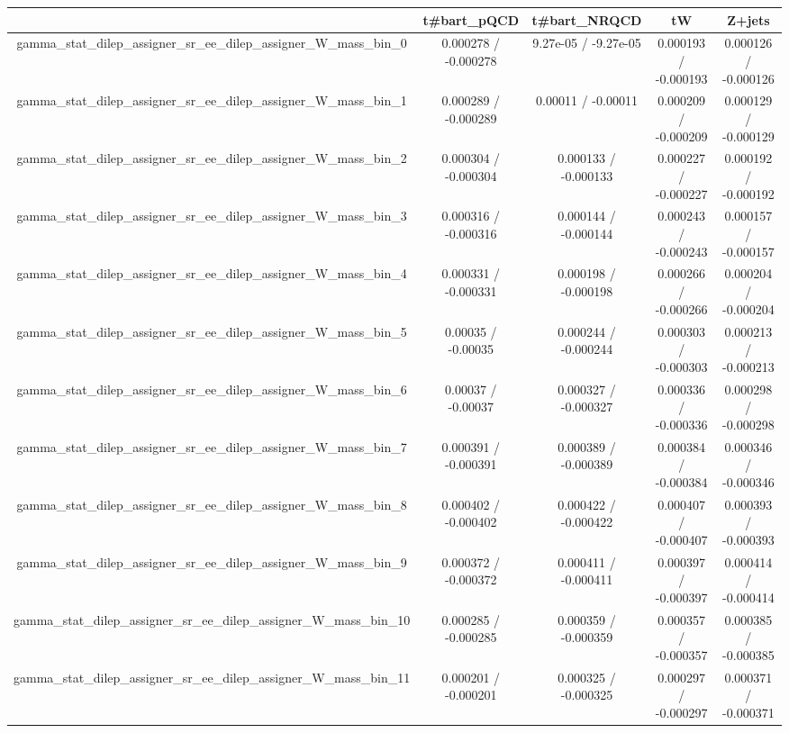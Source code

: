 \documentclass[10pt]{article}
\begin{document}
\begin{table}[htbp]
\begin{center}
\begin{tabular}{|c|c|c|c|c|}
\hline 
      & t#bar{t}_{pQCD}      & t#bar{t}_{NRQCD}      & tW      & Z+jets \\ 
\hline 
  gamma_stat_dilep_assigner_sr_ee_dilep_assigner_W_mass_bin_0 & 0.000278 / -0.000278 & 9.27e-05 / -9.27e-05 & 0.000193 / -0.000193 & 0.000126 / -0.000126 \\ 
  gamma_stat_dilep_assigner_sr_ee_dilep_assigner_W_mass_bin_1 & 0.000289 / -0.000289 & 0.00011 / -0.00011 & 0.000209 / -0.000209 & 0.000129 / -0.000129 \\ 
  gamma_stat_dilep_assigner_sr_ee_dilep_assigner_W_mass_bin_2 & 0.000304 / -0.000304 & 0.000133 / -0.000133 & 0.000227 / -0.000227 & 0.000192 / -0.000192 \\ 
  gamma_stat_dilep_assigner_sr_ee_dilep_assigner_W_mass_bin_3 & 0.000316 / -0.000316 & 0.000144 / -0.000144 & 0.000243 / -0.000243 & 0.000157 / -0.000157 \\ 
  gamma_stat_dilep_assigner_sr_ee_dilep_assigner_W_mass_bin_4 & 0.000331 / -0.000331 & 0.000198 / -0.000198 & 0.000266 / -0.000266 & 0.000204 / -0.000204 \\ 
  gamma_stat_dilep_assigner_sr_ee_dilep_assigner_W_mass_bin_5 & 0.00035 / -0.00035 & 0.000244 / -0.000244 & 0.000303 / -0.000303 & 0.000213 / -0.000213 \\ 
  gamma_stat_dilep_assigner_sr_ee_dilep_assigner_W_mass_bin_6 & 0.00037 / -0.00037 & 0.000327 / -0.000327 & 0.000336 / -0.000336 & 0.000298 / -0.000298 \\ 
  gamma_stat_dilep_assigner_sr_ee_dilep_assigner_W_mass_bin_7 & 0.000391 / -0.000391 & 0.000389 / -0.000389 & 0.000384 / -0.000384 & 0.000346 / -0.000346 \\ 
  gamma_stat_dilep_assigner_sr_ee_dilep_assigner_W_mass_bin_8 & 0.000402 / -0.000402 & 0.000422 / -0.000422 & 0.000407 / -0.000407 & 0.000393 / -0.000393 \\ 
  gamma_stat_dilep_assigner_sr_ee_dilep_assigner_W_mass_bin_9 & 0.000372 / -0.000372 & 0.000411 / -0.000411 & 0.000397 / -0.000397 & 0.000414 / -0.000414 \\ 
  gamma_stat_dilep_assigner_sr_ee_dilep_assigner_W_mass_bin_10 & 0.000285 / -0.000285 & 0.000359 / -0.000359 & 0.000357 / -0.000357 & 0.000385 / -0.000385 \\ 
  gamma_stat_dilep_assigner_sr_ee_dilep_assigner_W_mass_bin_11 & 0.000201 / -0.000201 & 0.000325 / -0.000325 & 0.000297 / -0.000297 & 0.000371 / -0.000371 \\ 

\end{tabular}
\end{center}
\end{table}
\end{document}
